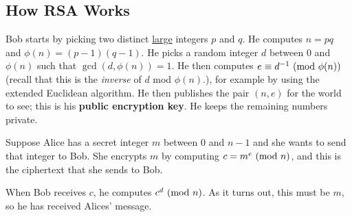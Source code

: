 \documentclass[letterpaper]{article}
\begin{document}
\subsection{How RSA Works}
Bob starts by picking two distinct \underline{large} integers $p$ and $q$. He computes $n = pq$ and $\phi(n) = (p - 1)(q - 1)$. He picks a random integer $d$ between 0 and $\phi(n)$ such that $\gcd(d, \phi(n)) = 1$. He then computes $e \equiv d^{-1} \ (\mathrm{mod}\ \phi(n))$ (recall that this is the \emph{inverse} of $d$ mod $\phi(n)$.), for example by using the extended Euclidean algorithm. He then publishes the pair $(n, e)$ for the world to see; this is his \textbf{public encryption key}. He keeps the remaining numbers private.

\bigskip 

Suppose Alice has a secret integer $m$ between 0 and $n - 1$ and she wants to send that integer to Bob. She encrypts $m$ by computing $c = m^e \ (\mathrm{mod}\ n)$, and this is the ciphertext that she sends to Bob. 

\bigskip 

When Bob receives $c$, he computes $c^d \ (\mathrm{mod}\ n)$. As it turns out, this must be $m$, so he has received Alices' message. 
\end{document}
